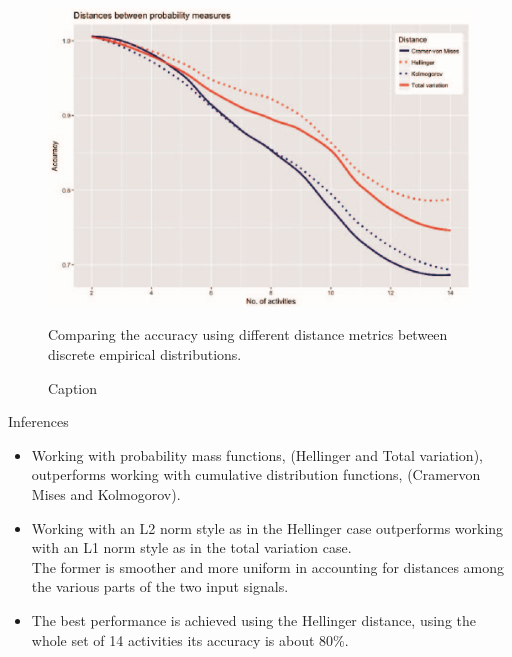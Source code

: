 \documentclass{beamer}
\begin{document}
\begin{frame}
    \begin{figure}[t]
        \centering
         \includegraphics[scale=0.4]{Images/Picture1.png}
        \caption{Comparing the accuracy using different distance metrics between discrete empirical distributions.}
        \caption{Caption}
        \label{fig:my_label}
    \end{figure}
   
\end{frame}
\begin{frame}{Inferences}
    \begin{itemize}
        \item Working with probability mass functions, (Hellinger and Total variation), outperforms working with cumulative distribution functions, (Cramervon Mises and Kolmogorov).
        \item Working with an L2 norm style as in the Hellinger case outperforms working with an L1 norm style as in the total variation case.\\
        The former is smoother and more uniform in accounting for distances among the various parts of the two input signals. 
        \item The best performance is achieved using the Hellinger distance, using the whole set of 14 activities its accuracy is about 80\%.
    \end{itemize}
\end{frame}
\end{document}
